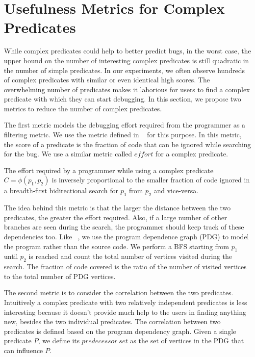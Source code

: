 
\section{Usefulness Metrics for Complex Predicates}
\label{sec-metrics}
While complex predicates could help to better predict bugs, in the worst case, the upper bound on the number of interesting complex predicates is still quadratic in the number of simple predicates.  In our experiments, we often observe hundreds of complex predicates with similar or even identical high scores.  The overwhelming number of predicates makes it laborious for users to find a complex predicate with which they can start debugging.  In this section, we propose two metrics to reduce the number of complex predicates.

The first metric models the debugging effort required from the programmer as a filtering metric.  We use the metric defined in ~\cite{1062522} for this purpose.  In this metric, the score of a predicate is the fraction of code that can be ignored while searching for the bug.  We use a similar metric called $effort$ for a complex predicate.

\begin{defn}
\label{dfn4}
The effort required by a programmer while using a complex predicate $C = \phi(p_1, p_2)$ is inversely proportional to the smaller fraction of code ignored in a breadth-first bidirectional search for $p_1$ from $p_2$ and vice-versa.
\end{defn}

The idea behind this metric is that the larger the distance between the two predicates, the greater the effort required.  Also, if a large number of other branches are seen during the search, the programmer should keep track of these dependencies too.  Like ~\cite{1062522}, we use the program dependence graph (PDG) to model the program rather than the source code. We perform a BFS starting from $p_1$ until $p_2$ is reached and count the total number of vertices visited during the search. The fraction of code covered is the ratio of the number of visited vertices to the total number of PDG vertices. 

The second metric is to consider the correlation between the two predicates.  Intuitively a complex predicate with two relatively independent predicates is less interesting because it doesn't provide much help to the users in finding anything new, besides the two individual predicates.  The correlation between two predicates is defined based on the program dependency graph.  Given a single predicate $P$, we define its $predecessor\ set$ as the set of vertices in the PDG that can influence $P$.

